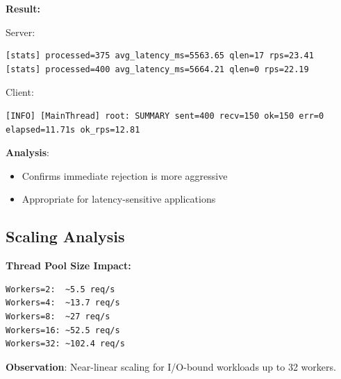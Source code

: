 \documentclass[12pt]{article}
\begin{document}
\textbf{Result:}

Server:
\begin{verbatim}
[stats] processed=375 avg_latency_ms=5563.65 qlen=17 rps=23.41
[stats] processed=400 avg_latency_ms=5664.21 qlen=0 rps=22.19
\end{verbatim}

Client:
\begin{verbatim}
[INFO] [MainThread] root: SUMMARY sent=400 recv=150 ok=150 err=0 elapsed=11.71s ok_rps=12.81
\end{verbatim}

\textbf{Analysis}:
\begin{itemize}
    \item Confirms immediate rejection is more aggressive
    \item Appropriate for latency-sensitive applications
\end{itemize}

\subsection{Scaling Analysis}

\textbf{Thread Pool Size Impact:}
\begin{verbatim}
Workers=2:  ~5.5 req/s
Workers=4:  ~13.7 req/s
Workers=8:  ~27 req/s
Workers=16: ~52.5 req/s
Workers=32: ~102.4 req/s
\end{verbatim}

\textbf{Observation}: Near-linear scaling for I/O-bound workloads up to 32 workers.
\end{document}
